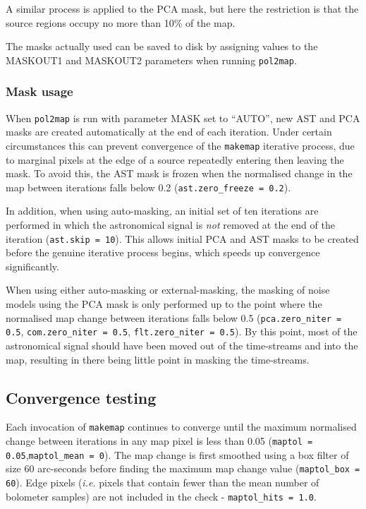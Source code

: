 \documentclass[twoside,11pt]{starlink}
\begin{document}
A similar process is applied to the PCA mask, but here the restriction is
that the source regions occupy no more than 10\% of the map.

The masks actually used can be saved to disk by assigning values to the
MASKOUT1 and MASKOUT2 parameters when running \texttt{pol2map}.

\subsubsection{Mask usage}

When \texttt{pol2map} is run with parameter MASK set to ``AUTO'', new
AST and PCA masks are created automatically at the end of each iteration.
Under certain circumstances this can prevent convergence of the
\texttt{makemap} iterative process, due to marginal pixels at the edge of
a source repeatedly entering then leaving the mask. To avoid this, the AST
mask is frozen when the normalised change in the map between iterations
falls below 0.2 (\texttt{ast.zero\_freeze = 0.2}).

In addition, when using auto-masking, an initial set of ten iterations
are performed in which the astronomical signal is \emph{not} removed at
the end of the iteration (\texttt{ast.skip = 10}). This allows initial PCA
and AST masks to be created before the genuine iterative process begins,
which speeds up convergence significantly.

When using either auto-masking or external-masking, the masking of noise
models using the PCA mask is only performed up to the point where the
normalised map change between iterations falls below 0.5
(\texttt{pca.zero\_niter = 0.5}, \texttt{com.zero\_niter = 0.5},
\texttt{flt.zero\_niter = 0.5}). By this point, most of the astronomical
signal should have been moved out of the time-streams and into the map,
resulting in there being little point in masking the time-streams.

\subsection{Convergence testing}

Each invocation of \texttt{makemap} continues to converge until the
maximum normalised change between iterations in any map pixel is less
than 0.05 (\texttt{maptol = 0.05},\texttt{maptol\_mean = 0}). The map
change is first smoothed using a  box filter of size 60 arc-seconds before
finding the maximum map change value (\texttt{maptol\_box = 60}). Edge pixels
(\emph{i.e.} pixels that contain fewer than the mean number of bolometer
samples) are not included in the check - \texttt{maptol\_hits = 1.0}.
\end{document}
